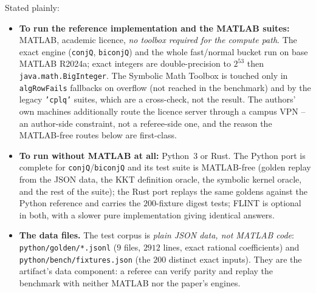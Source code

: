 \documentclass[11pt]{article}
\theoremstyle{definition}
\begin{document}
Stated plainly:
\begin{itemize}[nosep,leftmargin=*]
\item \textbf{To run the reference implementation and the MATLAB suites:}
  MATLAB, academic licence, \emph{no toolbox required for the compute path}.
  The exact engine (\texttt{conjQ}, \texttt{biconjQ}) and the whole
  fast/normal bucket run on base MATLAB R2024a; exact integers are
  double-precision to $2^{53}$ then \texttt{java.math.BigInteger}. The Symbolic
  Math Toolbox is touched only in \texttt{algRowFails} fallbacks on overflow
  (not reached in the benchmark) and by the legacy \texttt{'cplq'} suites,
  which are a cross-check, not the result.
 The
  authors' own machines additionally route the licence server through a campus
  VPN -- an author-side constraint, not a referee-side one, and the reason the
  MATLAB-free routes below are first-class.
\item \textbf{To run without MATLAB at all:} Python~3 or Rust. The Python port
  is complete for \texttt{conjQ}/\texttt{biconjQ} and its test suite is
  MATLAB-free (golden replay from the JSON data, the KKT definition oracle,
  the symbolic kernel oracle, and the rest of the suite); the Rust port
  replays the same goldens against the Python reference and carries the
  $200$-fixture digest tests; FLINT is optional in both, with a slower pure
  implementation giving identical answers.
\item \textbf{The data files.} The test corpus is \emph{plain JSON data, not
  MATLAB code}: \texttt{python/golden/*.jsonl} ($9$ files, $2912$ lines, exact
  rational coefficients) and \texttt{python/bench/fixtures.json} (the $200$
  distinct exact inputs). They are the artifact's data component: a referee can
  verify parity and replay the benchmark with neither MATLAB nor the paper's
  engines.
\end{itemize}
\end{document}
